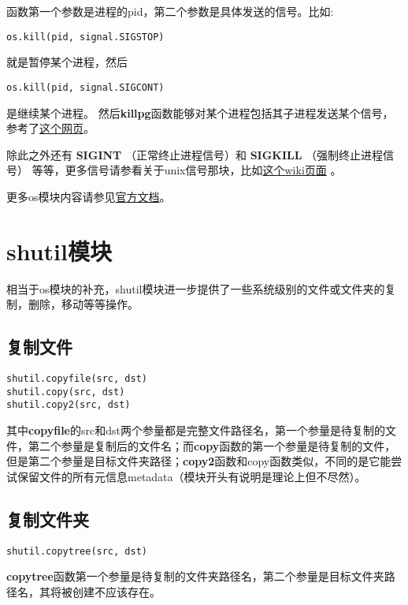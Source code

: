 \documentclass[12pt,oneside]{book}
\begin{document}
\begin{common-format}
函数第一个参数是进程的pid，第二个参数是具体发送的信号。比如:
\begin{Verbatim}
os.kill(pid, signal.SIGSTOP)
\end{Verbatim}
就是暂停某个进程，然后

\begin{Verbatim}
os.kill(pid, signal.SIGCONT)
\end{Verbatim}
是继续某个进程。 然后\textbf{killpg}函数能够对某个进程包括其子进程发送某个信号，参考了\href{http://kernelcheck.blogspot.com/2009/07/pausestop-process-in-python.html}{这个网页}。

除此之外还有 \textbf{SIGINT} （正常终止进程信号）和 \textbf{SIGKILL} （强制终止进程信号） 等等，更多信号请参看关于unix信号那块，比如\href{http://en.wikipedia.org/wiki/Unix_signal}{这个wiki页面} 。




\begin{large}
更多os模块内容请参见\href{https://docs.python.org/3.4/library/os.html}{官方文档}。
\end{large}



\chapter{shutil模块}
相当于os模块的补充，shutil模块进一步提供了一些系统级别的文件或文件夹的复制，删除，移动等等操作。

\section{复制文件}
\begin{Verbatim}
shutil.copyfile(src, dst)
shutil.copy(src, dst)
shutil.copy2(src, dst)
\end{Verbatim}
其中\textbf{copyfile}的src和dst两个参量都是完整文件路径名，第一个参量是待复制的文件，第二个参量是复制后的文件名；而\textbf{copy}函数的第一个参量是待复制的文件，但是第二个参量是目标文件夹路径；\textbf{copy2}函数和copy函数类似，不同的是它能尝试保留文件的所有元信息metadata（模块开头有说明是理论上但不尽然）。

\section{复制文件夹}
\begin{Verbatim}
shutil.copytree(src, dst)
\end{Verbatim}

\textbf{copytree}函数第一个参量是待复制的文件夹路径名，第二个参量是目标文件夹路径名，其将被创建不应该存在。


\end{common-format}
\end{document}
